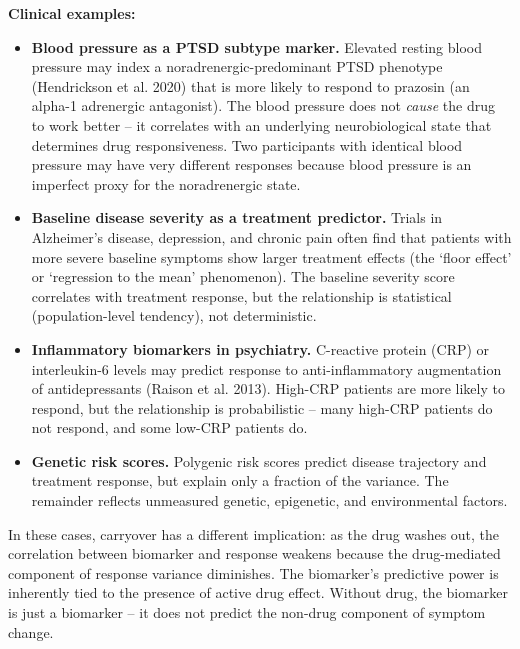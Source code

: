 \documentclass[
]{article}
\begin{document}
\textbf{Clinical examples:}

\begin{itemize}
\item \textbf{Blood pressure as a PTSD subtype marker.} Elevated resting
  blood pressure may index a noradrenergic-predominant PTSD
  phenotype (Hendrickson et al. 2020) that is more likely to
  respond to prazosin (an alpha-1 adrenergic antagonist). The
  blood pressure does not \textit{cause} the drug to work better --
  it correlates with an underlying neurobiological state that
  determines drug responsiveness. Two participants with
  identical blood pressure may have very different responses
  because blood pressure is an imperfect proxy for the
  noradrenergic state.

\item \textbf{Baseline disease severity as a treatment predictor.} Trials
  in Alzheimer's disease, depression, and chronic pain often
  find that patients with more severe baseline symptoms show
  larger treatment effects (the `floor effect' or `regression
  to the mean' phenomenon). The baseline severity score
  correlates with treatment response, but the relationship is
  statistical (population-level tendency), not deterministic.

\item \textbf{Inflammatory biomarkers in psychiatry.} C-reactive protein
  (CRP) or interleukin-6 levels may predict response to
  anti-inflammatory augmentation of antidepressants (Raison
  et al. 2013). High-CRP patients are more likely to respond,
  but the relationship is probabilistic -- many high-CRP
  patients do not respond, and some low-CRP patients do.

\item \textbf{Genetic risk scores.} Polygenic risk scores predict disease
  trajectory and treatment response, but explain only a fraction
  of the variance. The remainder reflects unmeasured genetic,
  epigenetic, and environmental factors.
\end{itemize}

In these cases, carryover has a different implication: as the
drug washes out, the correlation between biomarker and response
weakens because the drug-mediated component of response variance
diminishes. The biomarker's predictive power is inherently tied
to the presence of active drug effect. Without drug, the
biomarker is just a biomarker -- it does not predict the
non-drug component of symptom change.
\end{document}
